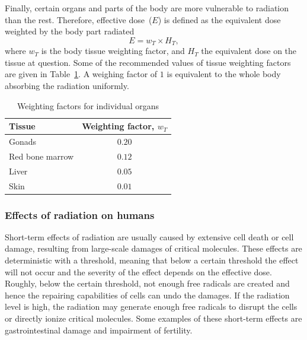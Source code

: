 \documentclass[nofootinbib,preprint,aps]{revtex4-1}
\begin{document}
        Finally, certain organs and parts of the body are more vulnerable to radiation than the rest.
        Therefore, effective dose~($E$) is defined as the equivalent dose weighted by the body part
        radiated
        \begin{equation}
            E = w_T \times H_T,
        \end{equation}
        where $w_T$ is the body tissue weighting factor, and $H_T$ the equivalent dose on the tissue
        at question.
        Some of the recommended values of tissue
        weighting factors are given in Table~\ref{tab:eff}. A weighing factor of $1$ is equivalent to the
        whole body absorbing the radiation uniformly.
        \begin{table}[h]
            \centering
            \caption{Weighting factors for individual organs \cite{icrp74}}
            \begin{ruledtabular}
                \begin{tabular}{l c}
                Tissue & Weighting factor, $w_T$\\
                \hline
                Gonads & $0.20$\\
                Red bone marrow & $0.12$ \\
                Liver & $0.05$ \\
                Skin & $0.01$ \\
                \end{tabular}
                \label{tab:eff}
            \end{ruledtabular}
        \end{table}

        \subsubsection{Effects of radiation on humans}
        Short-term effects of radiation are usually caused by extensive cell death or cell damage, resulting
        from large-scale damages of critical molecules.\cite{u16}
        These effects are deterministic with a threshold,
        meaning that below a certain threshold the effect will not occur and
        the severity of the effect depends on the effective dose. Roughly, below the certain threshold,
        not enough free radicals are created and hence the repairing capabilities of cells can undo the damages.
        If the radiation level is high, the radiation may generate enough free radicals to disrupt the cells or directly
        ionize critical molecules. Some examples of these short-term effects are gastrointestinal damage and impairment
        of fertility.\cite{u16}
\end{document}
